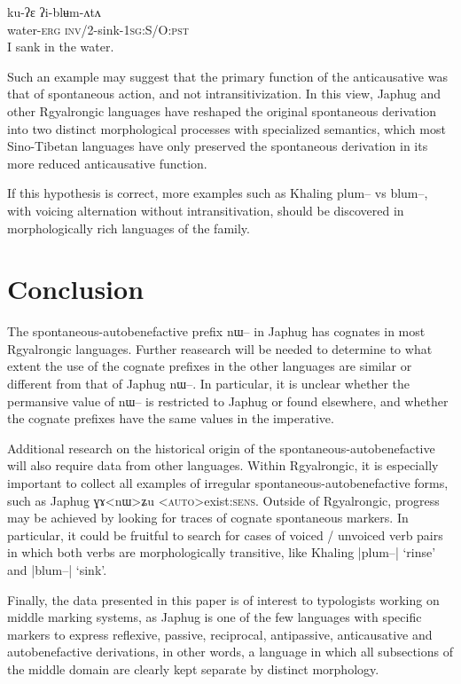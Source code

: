 \documentclass[oldfontcommands,oneside,a4paper,11pt]{article}
\newcommand{\ipa}[1]{{\phon \mbox{#1}}} %
\begin{document}
\begin{exe}
\ex \label{ex:iblumata}
\gll
\ipa{ku-ʔɛ} \ipa{ʔi-blʉm-ʌtʌ} \\
water-\textsc{erg} \textsc{inv/2}-sink-\textsc{1sg:S/O:pst}\\
\glt I sank in the water.
\end{exe}

Such an example may suggest that the primary function of the anticausative was that of spontaneous action, and not intransitivization. In this view, Japhug and other Rgyalrongic languages have reshaped the original spontaneous derivation into two distinct morphological processes with specialized semantics, which most Sino-Tibetan languages have only preserved the spontaneous derivation in its more reduced anticausative function. 

If this hypothesis is correct, more examples such as Khaling \ipa{plum--} vs \ipa{blum--}, with voicing alternation without intransitivation, should be discovered in morphologically rich languages of the family.

\section{Conclusion}
The spontaneous-autobenefactive prefix \ipa{nɯ--} in Japhug has cognates in most Rgyalrongic languages. Further reasearch will be needed to determine to what extent the use of the cognate prefixes in the other languages are similar or different from that of Japhug \ipa{nɯ--}. In particular, it is unclear whether the permansive value of \ipa{nɯ--} is restricted to Japhug or found elsewhere, and whether the cognate prefixes have the same values in the imperative.

Additional research on the historical origin of the spontaneous-autobenefactive will also require data from other languages. Within Rgyalrongic, it is especially important to collect all examples of irregular spontaneous-autobenefactive forms, such as Japhug \ipa{ɣɤ<nɯ>ʑu} <\textsc{auto}>exist:\textsc{sens}. Outside of Rgyalrongic, progress may be achieved by looking for traces of cognate spontaneous markers. In particular, it could be fruitful to search for cases of voiced / unvoiced verb pairs in which both verbs are morphologically transitive, like Khaling |\ipa{plum--}| `rinse' and |\ipa{blum--}| `sink'.

Finally, the data presented in this paper is of interest to typologists working on middle marking systems, as Japhug is one of the few languages with specific markers to express reflexive, passive, reciprocal, antipassive, anticausative and autobenefactive derivations, in other words, a language in which all subsections of the middle domain are clearly kept separate by distinct morphology.




 
\end{document}
